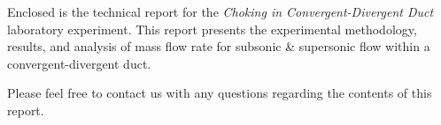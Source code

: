 



\fancyhead[C]{}
\fancyheadwidth[L]{0.5\headwidth}
\fancyheadwidth[C]{0.0\headwidth}
\fancyheadwidth[R]{0.5\headwidth}







\hypertarget{titlepage}{\maketitle}
\thispagestyle{empty}

\pagebreak


\thispagestyle{empty}

\DTMtoday

\vspace{5.0ex}

Enclosed is the technical report for the \textit{Choking in Convergent-Divergent Duct} laboratory experiment. This report presents the experimental methodology, results, and analysis of mass flow rate for subsonic \& supersonic flow within a convergent-divergent duct.

Please feel free to contact us with any questions regarding the contents of this report.

\vspace{5.0ex}

